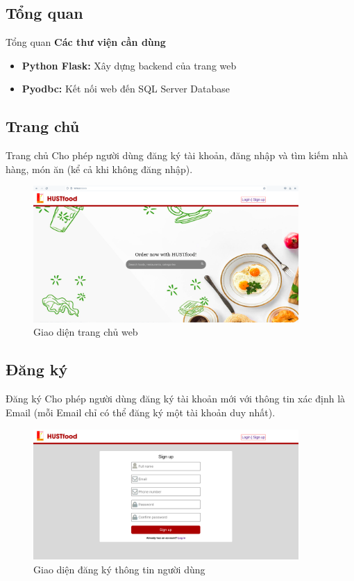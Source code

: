 \documentclass[aspectratio=43,xcolor=dvipsnames]{beamer}
\begin{document}
	\subsection{Tổng quan}
	\begin{frame}{Tổng quan}
	\textcolor{structure}{\large{\textbf{Các thư viện cần dùng}}}
		\begin{itemize}
			\item \textbf{Python Flask:} Xây dựng backend của trang web 
			\item \textbf{Pyodbc:} Kết nối web đến SQL Server Database
		\end{itemize}
    \end{frame}
	\subsection{Trang chủ}
	\begin{frame}{Trang chủ}
	Cho phép người dùng đăng ký tài khoản, đăng nhập và tìm kiếm nhà hàng, món ăn (kể cả khi không đăng nhập).		
	\begin{figure}[ht!]
		\centerline{\includegraphics[width=0.9\textwidth]{web-image/trangchu_chuadn.png}}
		\caption{Giao diện trang chủ web}
		\label{fig:ass1}
	\end{figure}
	\end{frame}
	\subsection{Đăng ký}
	\begin{frame}{Đăng ký}
	Cho phép người dùng đăng ký tài khoản mới với thông tin xác định là Email (mỗi Email chỉ có thể đăng ký một tài khoản duy nhất).
		\begin{figure}[ht!]
			\centerline{\includegraphics[width=0.9\textwidth]{web-image/dangky.png}}
			\caption{Giao diện đăng ký thông tin người dùng}
			\label{fig:ass1}
		\end{figure}
	\end{frame}
\end{document}
